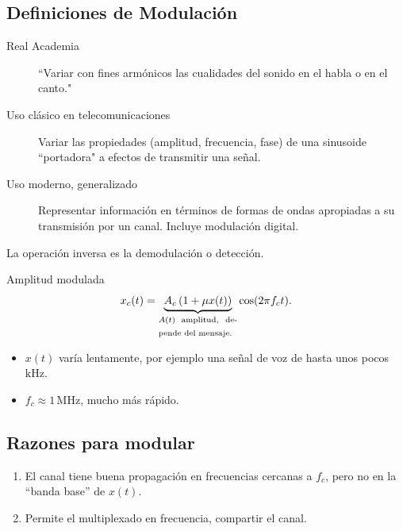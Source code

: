 
\subsection*{Definiciones de Modulación}
%
\begin{description}
\item[Real Academia] ``Variar con fines armónicos las cualidades del sonido en el habla o en el canto."
\item[Uso clásico en telecomunicaciones] Variar las propiedades (amplitud, frecuencia, fase) de una sinusoide ``portadora" a efectos de transmitir una señal.
\item[Uso moderno, generalizado] Representar información en términos de formas de ondas apropiadas a su transmisión por un canal. Incluye modulación digital.
\end{description}


La operación inversa es la demodulación o detección.

\begin{ejemplo}
Amplitud modulada
\[x_c(t)=\underbrace{A_c\left(1+\mu x(t)\right)}_{\text{\begin{minipage}{2.5cm} $A(t)$  amplitud, depende del mensaje. \end{minipage}}}\cos(2\pi f_c t).\]

\begin{figure}[htb]
\centering
{}
\end{figure}

    \begin{itemize}
        \item $x(t)$ varía lentamente, por ejemplo una señal de voz de hasta unos pocos $\unit{\kHz}$.
        \item $f_c \approx 1\,\unit{\MHz}$, mucho más rápido.
    \end{itemize}
\end{ejemplo}

\subsection*{Razones para modular}
\begin{enumerate}
    \item El canal tiene buena propagación en frecuencias cercanas a $f_c$, pero no en la ``banda base'' de $x(t)$.
    \item \label{raz2} Permite el multiplexado en frecuencia, compartir el canal.
\end{enumerate}

